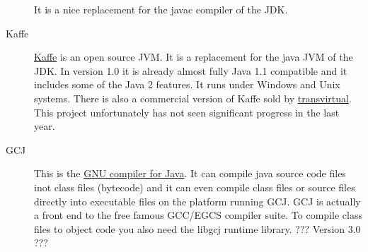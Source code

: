 \begin{description}
  It is a nice replacement for the javac compiler of the JDK.
\item[Kaffe]  \href{http://www.kaffe.org/}{Kaffe} 
  is an open source 
  JVM. It is a replacement for the java JVM of the JDK. In version 1.0 it is
  already almost fully Java 1.1 compatible and it includes some of the
  Java 2 features. It runs under Windows and Unix systems. There is also
  a commercial version of Kaffe sold by 
  \href{http://www.transvirtual.com}{transvirtual}. This project unfortunately
  has not seen significant progress in the last year.
\item[GCJ]  This is the 
  \href{http://sourceware.cygnus.com/java/gcj.html}{GNU compiler for Java}. 
  It can compile java
  source code files inot class files (bytecode) and it can even
  compile class files or source files directly into executable
  files on the platform running GCJ. GCJ is actually a front end
  to the free famous GCC/EGCS compiler suite. To compile class files
  to object code you also need the libgcj runtime library.
 ??? Version 3.0 ???


\end{description}
